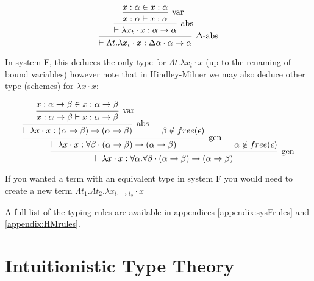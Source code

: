             \[\begin{array}{c}
            \mbox{\begin{prooftree}
                  \hypo{x : \alpha \in x : \alpha}
                \infer1[var]{x : \alpha \vdash x : \alpha}
               \infer1[abs]{\vdash \lambda x_t \cdot x : \alpha \to \alpha}
               \infer1[$\Delta$-abs]{\vdash \Lambda t . \lambda x_t \cdot
                 x : \Delta \alpha \cdot \alpha \to \alpha}
            \end{prooftree}}
            \end{array} \]
            
            In system F, this deduces the only type for $\Lambda t . \lambda x_t
            \cdot x$ (up to the renaming of bound variables) however note that
            in Hindley-Milner we may also deduce other type (schemes)
            for $\lambda x \cdot x$: 
            
            \[\begin{array}{c}
            \mbox{\begin{prooftree}
                        \hypo{x : \alpha \to \beta \in x : \alpha \to \beta}
                    \infer1[var]{x : \alpha \to \beta \vdash x : \alpha \to \beta}   
                    \infer1[abs]{\vdash \lambda x \cdot x : (\alpha \to \beta) \to
                    (\alpha \to \beta)}
                    \hypo{\beta \notin free(\epsilon)}        
                \infer2[gen]{\vdash \lambda x \cdot x : \forall \beta \cdot
                  (\alpha \to \beta) \to (\alpha \to \beta)}
                \hypo{\alpha \notin free(\epsilon)}
               \infer2[gen]{\vdash \lambda x \cdot x : \forall \alpha . \forall
                 \beta \cdot (\alpha \to \beta) \to (\alpha \to \beta)}
            \end{prooftree}}
            \end{array} \]
                                   
            If you wanted a term with an equivalent type in system F you would
            need to create a new term $\Lambda t_1 . \Lambda t_2 . \lambda x_{t_1
              \to t_2} \cdot x$
            
            A full list of the typing rules are available in
            appendices \ref{appendix:sysFrules} and
            \ref{appendix:HMrules}. 
                    
          \section{Intuitionistic Type Theory}
        
